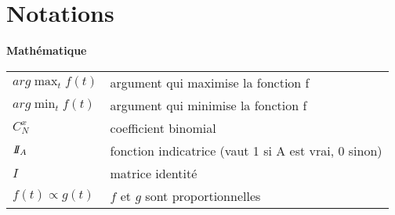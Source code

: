 \chapter*{Notations}

\begin{center}
\Large
\bf
Math\'ematique
\end{center}
\begin{center}
\begin{tabular*}{15.2cm}{p{4cm} p{11.2cm}}
$arg \max_t f(t)$  & argument qui maximise la fonction f \\ 
$arg \min_t f(t)$  & argument qui minimise la fonction f \\ 
$C_N^x$          & coefficient binomial \\
$I\!\!I_A$   &   fonction indicatrice (vaut 1 si A est vrai, 0 sinon)  \\
$I$       & matrice identit\'e \\
$f(t) \propto g(t)$ & $f$ et $g$ sont proportionnelles  
\end{tabular*}
\end{center}


